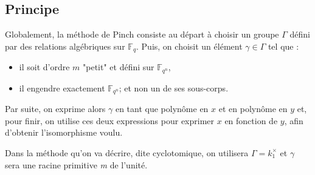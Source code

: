 \documentclass[a4paper]{article} %
\numberwithin{section}{part}
\numberwithin{equation}{section}
\newcommand\nroot[1]{\textit{#1}\up{\textit{ième}}}
\newcommand\GF[1]{\mathbb{F}_{#1}}
\begin{document}
\subsection{Principe}
Globalement, la méthode de Pinch consiste au départ à choisir un groupe $\Gamma$
défini par des relations algébriques sur $\GF{q}$. Puis, on choisit un élément 
$\gamma\in\Gamma$ tel que :
\vspace{0.3cm}
\begin{itemize}
\item il soit d'ordre $m$ "petit" et défini sur $\GF{q^n}$,
\item il engendre exactement $\GF{q^n}$; et non un de ses sous-corps.
\end{itemize}
\vspace{0.3cm}
Par suite, on exprime alors $\gamma$ en tant que polynôme en $x$ et en
polynôme en $y$ et, pour finir, on utilise ces deux expressions pour exprimer 
$x$ en fonction de $y$, afin d'obtenir l'isomorphisme voulu.\par
Dans la méthode qu'on va décrire, dite cyclotomique, on utilisera $\Gamma =
k_1^{\times}$ et $\gamma$ sera une racine primitive \nroot{m} de l'unité.

\vspace{0.3cm}
\end{document}
